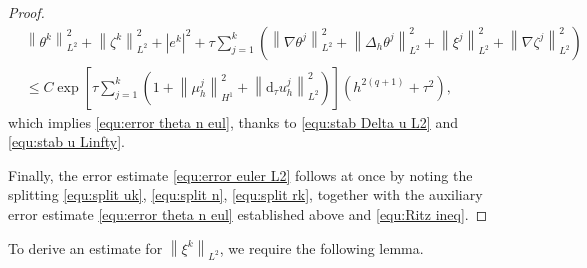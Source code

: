 \documentclass[11pt, reqno]{amsart}
\theoremstyle{definition}
\numberwithin{equation}{section}
\newcommand{\dtt}{\mathrm{d}_\tau}
\newcommand{\norm}[2]{\left\|{#1}\right\|_{#2}}
\newcommand{\abs}[1]{\left|{#1}\right|}
\begin{document}
\begin{proof}
\begin{align*}
	&\norm{\theta^k}{L^2}^2
	+
	\norm{\zeta^k}{L^2}^2
	+
	\abs{e^k}^2
	+
	\tau \sum_{j=1}^k \left(\norm{\nabla \theta^j}{L^2}^2
	+
	\norm{\Delta_h \theta^j}{L^2}^2
	+
	\norm{\xi^j}{L^2}^2
	+
	\norm{\nabla \zeta^j}{L^2}^2 \right)
	\nonumber\\
	&\leq
	C \exp\left[ \tau \sum_{j=1}^k \left(1+\norm{\mu_h^j}{H^1}^2 +\norm{\dtt u_h^j}{L^2}^2 \right) \right] (h^{2(q+1)}+\tau^2),
\end{align*}
which implies \eqref{equ:error theta n eul}, {thanks to \eqref{equ:stab Delta u L2} and \eqref{equ:stab u Linfty}}.

Finally, the error estimate \eqref{equ:error euler L2} follows at once by noting the splitting \eqref{equ:split uk}, \eqref{equ:split n}, \eqref{equ:split rk}, together with the auxiliary error estimate \eqref{equ:error theta n eul} established above and \eqref{equ:Ritz ineq}.
\end{proof}


To derive an estimate for $\norm{\xi^k}{L^2}$, we require the following lemma.
\end{document}
